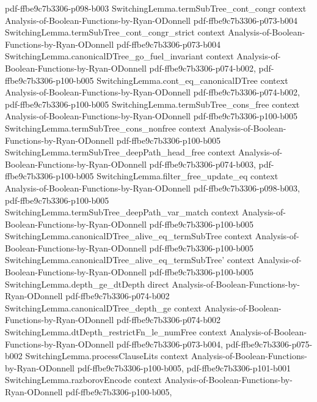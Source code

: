 \begin{theorem}
  {pdf-ffbe9c7b3306-p098-b003}
\proofstep
  {SwitchingLemma.termSubTree_cont_congr}
  {context}
  {Analysis-of-Boolean-Functions-by-Ryan-ODonnell}
  {pdf-ffbe9c7b3306-p073-b004}
\proofstep
  {SwitchingLemma.termSubTree_cont_congr_strict}
  {context}
  {Analysis-of-Boolean-Functions-by-Ryan-ODonnell}
  {pdf-ffbe9c7b3306-p073-b004}
\proofstep
  {SwitchingLemma.canonicalDTree_go_fuel_invariant}
  {context}
  {Analysis-of-Boolean-Functions-by-Ryan-ODonnell}
  {pdf-ffbe9c7b3306-p074-b002,
    pdf-ffbe9c7b3306-p100-b005}
\proofstep
  {SwitchingLemma.cont_eq_canonicalDTree}
  {context}
  {Analysis-of-Boolean-Functions-by-Ryan-ODonnell}
  {pdf-ffbe9c7b3306-p074-b002,
    pdf-ffbe9c7b3306-p100-b005}
\proofstep
  {SwitchingLemma.termSubTree_cons_free}
  {context}
  {Analysis-of-Boolean-Functions-by-Ryan-ODonnell}
  {pdf-ffbe9c7b3306-p100-b005}
\proofstep
  {SwitchingLemma.termSubTree_cons_nonfree}
  {context}
  {Analysis-of-Boolean-Functions-by-Ryan-ODonnell}
  {pdf-ffbe9c7b3306-p100-b005}
\proofstep
  {SwitchingLemma.termSubTree_deepPath_head_free}
  {context}
  {Analysis-of-Boolean-Functions-by-Ryan-ODonnell}
  {pdf-ffbe9c7b3306-p074-b003,
    pdf-ffbe9c7b3306-p100-b005}
\proofstep
  {SwitchingLemma.filter_free_update_eq}
  {context}
  {Analysis-of-Boolean-Functions-by-Ryan-ODonnell}
  {pdf-ffbe9c7b3306-p098-b003,
    pdf-ffbe9c7b3306-p100-b005}
\proofstep
  {SwitchingLemma.termSubTree_deepPath_var_match}
  {context}
  {Analysis-of-Boolean-Functions-by-Ryan-ODonnell}
  {pdf-ffbe9c7b3306-p100-b005}
\proofstep
  {SwitchingLemma.canonicalDTree_alive_eq_termSubTree}
  {context}
  {Analysis-of-Boolean-Functions-by-Ryan-ODonnell}
  {pdf-ffbe9c7b3306-p100-b005}
\proofstep
  {SwitchingLemma.canonicalDTree_alive_eq_termSubTree'}
  {context}
  {Analysis-of-Boolean-Functions-by-Ryan-ODonnell}
  {pdf-ffbe9c7b3306-p100-b005}
\proofstep
  {SwitchingLemma.depth_ge_dtDepth}
  {direct}
  {Analysis-of-Boolean-Functions-by-Ryan-ODonnell}
  {pdf-ffbe9c7b3306-p074-b002}
\proofstep
  {SwitchingLemma.canonicalDTree_depth_ge}
  {context}
  {Analysis-of-Boolean-Functions-by-Ryan-ODonnell}
  {pdf-ffbe9c7b3306-p074-b002}
\proofstep
  {SwitchingLemma.dtDepth_restrictFn_le_numFree}
  {context}
  {Analysis-of-Boolean-Functions-by-Ryan-ODonnell}
  {pdf-ffbe9c7b3306-p073-b004,
    pdf-ffbe9c7b3306-p075-b002}
\proofstep
  {SwitchingLemma.processClauseLits}
  {context}
  {Analysis-of-Boolean-Functions-by-Ryan-ODonnell}
  {pdf-ffbe9c7b3306-p100-b005,
    pdf-ffbe9c7b3306-p101-b001}
\proofstep
  {SwitchingLemma.razborovEncode}
  {context}
  {Analysis-of-Boolean-Functions-by-Ryan-ODonnell}
  {pdf-ffbe9c7b3306-p100-b005,
}
\end{theorem}

